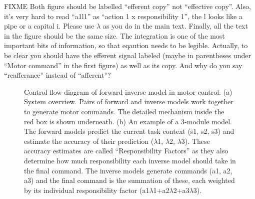 FIXME Both figure should be labelled ``efferent copy'' not ``effective
copy''.  Also, it's very hard to read ``a1l1'' as ``action 1  x
responsibility 1'', the l looks like a pipe or a capital i. Please use
$\lambda$ as you do in the main text. Finally, all the text
in the figure should be the same size.  The integration is one of the
most important bits of information, so that eqaution needs to be
legible.
Actually, to be clear you should have the efferent signal labeled
(maybe in parentheses under ``Motor command'' in the first figure) as
well as its copy.  And why do you say ``reafferance'' instead of ``afferent''?
\begin{figure}
  \centering
      \vspace{0.5cm}
%
      \caption{ \scriptsize{Control flow diagram of forward-inverse
          model in motor control. (a) System overview. Pairs of
          forward and inverse models work together to generate motor
          commands. The detailed mechanism inside the red box is shown
          underneath. (b) An example of a 3-module model. The forward
          models predict the current task context (s1, s2, s3) and
          estimate the accuracy of their prediction ($\lambda$1, $\lambda$2,
          $\lambda$3). These accuracy estimates are called ``Responsibility
          Factors'' as they also determine how much responsibility
          each inverse model should take in the final command. The
          inverse models generate commands (a1, a2, a3) and the final
          command is the summation of these, each weighted by its
          individual responsibility factor (a1$\lambda$1+a2$\lambda$2+a3$\lambda$3).  } }
\label{fig:control}
\end{figure}


